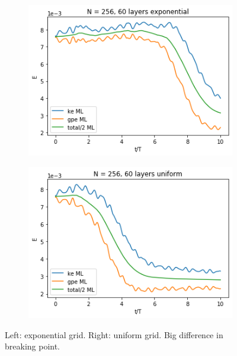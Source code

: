 \documentclass{article}
\begin{document}
\begin{figure}[H]
    \begin{subfigure}{0.5\linewidth}
    \includegraphics[width=\linewidth]{figures/stokes_ak035_256.png} 
    \end{subfigure}
    \begin{subfigure}{0.5\linewidth}
    \includegraphics[width=\linewidth]{figures/stokes_ak035_256_uniform.png}
    \end{subfigure}
    \caption{Left: exponential grid. Right: uniform grid. Big difference in breaking point.}
    \label{fig:fig1}
\end{figure}
\end{document}
